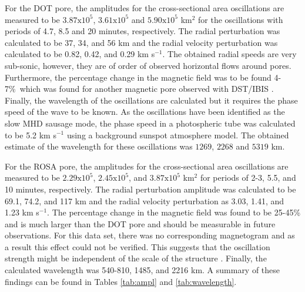     For the DOT pore, the amplitudes for the cross-sectional area oscillations are measured to be $3.87\mathrm{x}10^5$, $3.61\mathrm{x}10^5$ and $5.90\mathrm{x}10^5$ km$^2$ for the oscillations with periods of 4.7, 8.5 and 20 minutes, respectively.
    The radial perturbation was calculated to be 37, 34, and 56 km and the radial velocity perturbation was calculated to be 0.82, 0.42, and 0.29 km s$^{-1}$.
    The obtained radial speeds are very sub-sonic, however, they are of order of observed horizontal flows around pores.
    Furthermore, the percentage change in the magnetic field was to be found 4-7\%\ which was found for another magnetic pore observed with DST/IBIS \citep{0004-637X-806-1-132}.
    Finally, the wavelength of the oscillations are calculated but it requires the phase speed of the wave to be known.
    As the oscillations have been identified as the slow MHD sausage mode, the phase speed in a photospheric tube was calculated to be 5.2 km s$^{-1}$ using a background sunspot atmosphere model.
    The obtained estimate of the wavelength for these oscillations was $1269$, $2268$ and $5319$ km.
       
	For the ROSA pore, the amplitudes for the cross-sectional area oscillations are measured to be $2.29\mathrm{x}10^5$, $2.45\mathrm{x}10^5$, and $3.87\mathrm{x}10^5$ km$^2$ for periods of 2-3, 5.5, and 10 minutes, respectively.
    The radial perturbation amplitude was calculated to be 69.1, 74.2, and 117 km and the radial velocity perturbation as 3.03, 1.41, and 1.23 km s$^{-1}$.
    The percentage change in the magnetic field was found to be  25-45\% and is much larger than the DOT pore and should be measurable in future observations. 
    For this data set, there was no corresponding magnetogram and as a result this effect could not be verified.
    This suggests that the oscillation strength might be independent of the scale of the structure \citep{Dorotovic2014}. 
    Finally, the calculated wavelength was 540-810, 1485, and 2216 km.
    A summary of these findings can be found in Tables \ref{tab:ampl} and \ref{tab:wavelength}.
      
